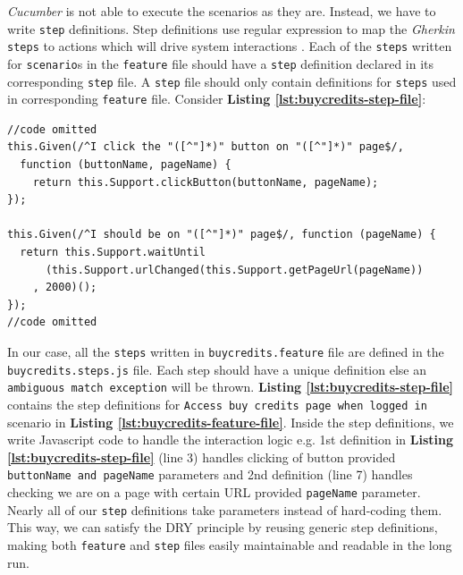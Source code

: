 \textit{Cucumber} is not able to execute the scenarios as they are. Instead, we have to write \texttt{step} definitions. Step definitions use regular expression to map the \textit{Gherkin} \texttt{steps} to actions which will drive system interactions \cite{stepfile1}. Each of the \texttt{steps} written for \texttt{scenario}s in the \texttt{feature} file should have a \texttt{step} definition declared in its corresponding \texttt{step} file. A \texttt{step} file should only contain definitions for \texttt{steps} used in corresponding \texttt{feature} file. Consider \textbf{Listing \ref{lst:buycredits-step-file}}:\\

\begin{listing}[H]
\begin{verbatim}
//code omitted
this.Given(/^I click the "([^"]*)" button on "([^"]*)" page$/,
  function (buttonName, pageName) {
    return this.Support.clickButton(buttonName, pageName);
});

this.Given(/^I should be on "([^"]*)" page$/, function (pageName) {
  return this.Support.waitUntil
      (this.Support.urlChanged(this.Support.getPageUrl(pageName))
    , 2000)();
});
//code omitted
\end{verbatim}
\label{lst:buycredits-step-file}
\end{listing}

In our case, all the \texttt{steps} written in \texttt{buycredits.feature} file are defined in the \texttt{buycredits.steps.js} file. Each step should have a unique definition else an \texttt{ambiguous match exception} will be thrown. \textbf{Listing \ref{lst:buycredits-step-file}} contains the step definitions for \texttt{Access buy credits page when logged in} scenario in \textbf{Listing \ref{lst:buycredits-feature-file}}. Inside the step definitions, we write Javascript code to handle the interaction logic e.g. 1st definition in \textbf{Listing \ref{lst:buycredits-step-file}} (line 3) handles clicking of button provided  \texttt{buttonName and pageName} parameters and 2nd definition (line 7) handles checking we are on a page with certain URL provided  \texttt{pageName} parameter. Nearly all of our \texttt{step} definitions take parameters instead of hard-coding them. This way, we can satisfy the DRY principle by reusing generic step definitions, making both  \texttt{feature} and  \texttt{step} files easily maintainable and readable in the long run.

